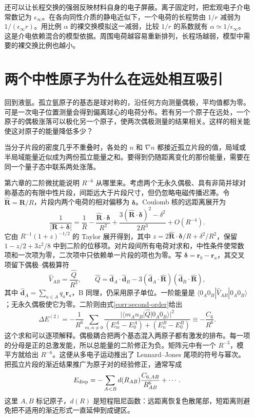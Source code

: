 还可以让长程交换的强弱反映材料自身的电子屏蔽。离子固定时，把宏观电子介电常数记为 $\epsilon_\infty$。在各向同性介质的静电近似下，一个电荷的长程势由 $1/r$ 减弱为 $1/(\epsilon_\infty r)$。用比例 $\alpha$ 的裸交换模拟这一减弱，比较 $1/r$ 的系数就有 $\alpha\simeq1/\epsilon_\infty$。这是介电依赖混合的模型依据。周围电荷越容易重新排列，长程场越弱，模型中需要的裸交换比例也越小。

\section{两个中性原子为什么在远处相互吸引}\label{xc:dispersion-physics}
回到液氩。孤立氩原子的基态是球对称的，沿任何方向测量偶极，平均值都为零。可是一次电子位置测量会得到偏离球心的电荷分布。若有另一个原子在远处，一个原子的偶极涨落可以极化另一个原子，使两次偶极测量的结果相关。这样的相关能使这对原子的能量降低多少？

当分子片段的密度几乎不重叠时，各处的 $n$ 和 $\nabla n$ 都接近孤立片段的值，局域或半局域能量近似成为两份孤立能量之和。要得到仍随距离变化的那份能量，需要在同一个量子态中联系两处涨落。

第六章的二阶微扰能说明 $R^{-6}$ 从哪里来。考虑两个无永久偶极、具有非简并球对称基态的有限中性片段，间距远大于片段尺寸，但仍忽略电磁传播迟滞。令 $\widehat{\bm R}=\bm R/R$，片段内两个电荷的相对偏移为 $\bm\delta$。Coulomb 核的远距离展开为
\begin{equation}
\frac1{|\bm R+\bm\delta|}
=\frac1R-\frac{\widehat{\bm R}\cdot\bm\delta}{R^2}
+\frac{3(\widehat{\bm R}\cdot\bm\delta)^2-\delta^2}{2R^3}
+O(R^{-4}).
\end{equation}
它由 $R^{-1}(1+z)^{-1/2}$ 的 Taylor 展开得到，其中 $z=2\widehat{\bm R}\cdot\bm\delta/R+\delta^2/R^2$，保留 $1-z/2+3z^2/8$ 中到二阶的位移项。对片段间所有电荷对求和，中性条件使常数项和一次项为零，二次项中只依赖单一片段的项也为零。写 $\bm\delta=\bm r_b-\bm r_a$，其交叉项留下偶极--偶极算符
\begin{equation}
\hat V_{AB}=\frac{\hat Q}{R^3},\qquad
\hat Q=\hat{\bm d}_A\cdot\hat{\bm d}_B
-3(\hat{\bm d}_A\cdot\widehat{\bm R})(\hat{\bm d}_B\cdot\widehat{\bm R}),
\end{equation}
其中 $\hat{\bm d}_A=\sum_{a\in A}q_a\bm r_a$，B 同理，仍采用原子单位。一阶能量是 $\langle0_A0_B|\hat V_{AB}|0_A0_B\rangle$；无永久偶极使它为零。二阶则由式\eqref{corr:second-order}给出
\begin{equation}
\Delta E^{(2)}=-\frac1{R^6}
\sum_{m,n\ne0}\frac{|\langle m_An_B|\hat Q|0_A0_B\rangle|^2}
{(E_m^A-E_0^A)+(E_n^B-E_0^B)}
\equiv-\frac{C_6}{R^6}.
\end{equation}
这个求和可以逐项解释。偶极耦合把两个基态混入两原子都有激发的排布。每一项的分母是正的总激发能，所以总能量的二阶修正为负。矩阵元中有一个 $R^{-3}$，模平方就给出 $R^{-6}$。这便从多电子运动推出了 Lennard--Jones 尾项的符号与幂次。把孤立片段的渐近结果推广为原子对的经验修正，通常写成
\begin{equation}
E_{\rm disp}=-\sum_{A<B}d(R_{AB})\frac{C_{6,AB}}{R_{AB}^6}+\cdots.
\end{equation}
这里 $A,B$ 标记原子，$d(R)$ 是短程阻尼函数：远距离恢复色散尾部，短距离则避免把不适用的渐近形式一直延伸到成键区。

